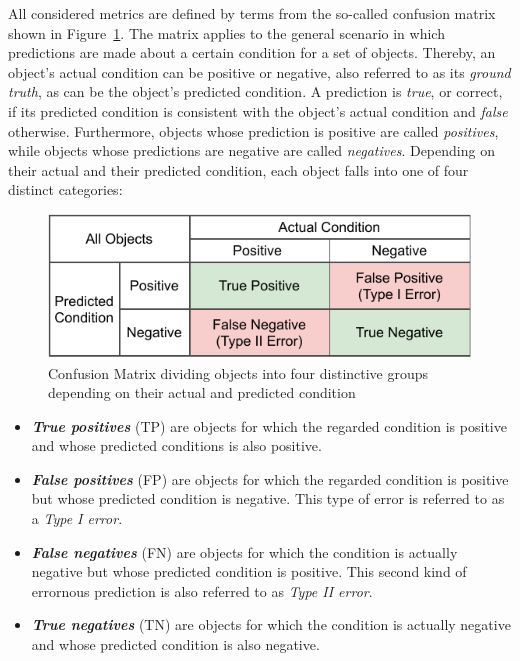 All considered metrics are defined by terms from the so-called confusion matrix shown in Figure~\ref{fig:2_basics/4_metrics/1_confusion_matrix}. The matrix applies to the general scenario in which predictions are made about a certain condition for a set of objects. Thereby, an object's actual condition can be positive or negative, also referred to as its \emph{ground truth}, as can be the object's predicted condition. A prediction is \emph{true}, or correct, if its predicted condition is consistent with the object's actual condition and \emph{false} otherwise. Furthermore, objects whose prediction is positive are called \emph{positives}, while objects whose predictions are negative are called \emph{negatives}. Depending on their actual and their predicted condition, each object falls into one of four distinct categories:

\begin{figure}[t]
    \centering
    \includegraphics[width=\textwidth]{2_basics/4_metrics/1_confusion_matrix/confusion_matrix}
    \caption{Confusion Matrix dividing objects into four distinctive groups depending on their actual and predicted condition}
    \label{fig:2_basics/4_metrics/1_confusion_matrix}
\end{figure}

\begin{itemize}
    \item \textbf{\emph{True positives}} (TP) are objects for which the regarded condition is positive and whose predicted conditions is also positive.

    \item \textbf{\emph{False positives}} (FP) are objects for which the regarded condition is positive but whose predicted condition is negative. This type of error is referred to as a \emph{Type I error}.

    \item \textbf{\emph{False negatives}} (FN) are objects for which the condition is actually negative but whose predicted condition is positive. This second kind of errornous prediction is also referred to as \emph{Type II error}.

    \item \textbf{\emph{True negatives}} (TN) are objects for which the condition is actually negative and whose predicted condition is also negative.
\end{itemize}

